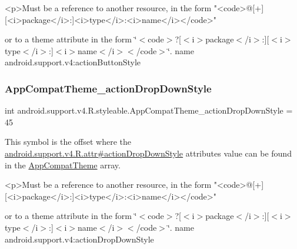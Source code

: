 \begin{DoxyVerb}      <p>Must be a reference to another resource, in the form "<code>@[+][<i>package</i>:]<i>type</i>:<i>name</i></code>"
\end{DoxyVerb}
 or to a theme attribute in the form \char`\"{}$<$code$>$?\mbox{[}$<$i$>$package$<$/i$>$\+:\mbox{]}\mbox{[}$<$i$>$type$<$/i$>$\+:\mbox{]}$<$i$>$name$<$/i$>$$<$/code$>$\char`\"{}.  name android.\+support.\+v4\+:action\+Button\+Style \mbox{\label{classandroid_1_1support_1_1v4_1_1R_1_1styleable_a31fc54e0e58a5938661e66469a5a5b5f}} 
\subsubsection{\texorpdfstring{App\+Compat\+Theme\+\_\+action\+Drop\+Down\+Style}{AppCompatTheme\_actionDropDownStyle}}
{\footnotesize\ttfamily int android.\+support.\+v4.\+R.\+styleable.\+App\+Compat\+Theme\+\_\+action\+Drop\+Down\+Style = 45\hspace{0.3cm}{\ttfamily [static]}}

This symbol is the offset where the \hyperlink{classandroid_1_1support_1_1v4_1_1R_1_1attr_ae799f8ef42f49ca4ab5fde37b9c1d639}{android.\+support.\+v4.\+R.\+attr\#action\+Drop\+Down\+Style} attribute\textquotesingle{}s value can be found in the \hyperlink{classandroid_1_1support_1_1v4_1_1R_1_1styleable_ac07ebbe62ed977f6dcaadc6397840ace}{App\+Compat\+Theme} array.

\begin{DoxyVerb}      <p>Must be a reference to another resource, in the form "<code>@[+][<i>package</i>:]<i>type</i>:<i>name</i></code>"
\end{DoxyVerb}
 or to a theme attribute in the form \char`\"{}$<$code$>$?\mbox{[}$<$i$>$package$<$/i$>$\+:\mbox{]}\mbox{[}$<$i$>$type$<$/i$>$\+:\mbox{]}$<$i$>$name$<$/i$>$$<$/code$>$\char`\"{}.  name android.\+support.\+v4\+:action\+Drop\+Down\+Style \mbox{\label{classandroid_1_1support_1_1v4_1_1R_1_1styleable_a8d4a63cac0fa21d43ff5e5b99a180331}} 

